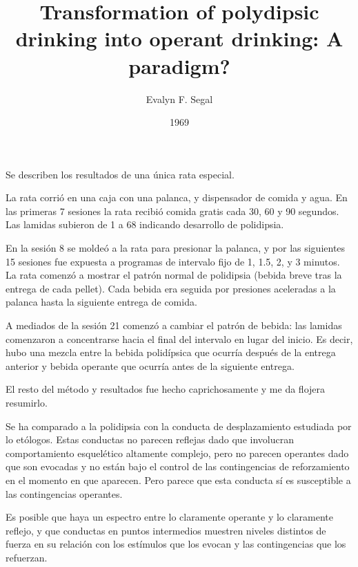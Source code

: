 \documentclass[a4paper,12pt]{article}
\title{Transformation of polydipsic drinking into operant drinking: A paradigm?}
\author{Evalyn F. Segal}
\date{1969}
\begin{document}
{\scshape\bfseries \maketitle}

Se describen los resultados de una única rata especial.

La rata corrió en una caja con una palanca, y dispensador de comida y agua. En las primeras 7 sesiones la rata recibió comida gratis cada 30, 60 y 90 segundos. Las lamidas subieron de 1 a 68 indicando desarrollo de polidipsia.

En la sesión 8 se moldeó a la rata para presionar la palanca, y por las siguientes 15 sesiones fue expuesta a programas de intervalo fijo de 1, 1.5, 2, y 3 minutos. La rata comenzó a mostrar el patrón normal de polidipsia (bebida breve tras la entrega de cada pellet). Cada bebida era seguida por presiones aceleradas a la palanca hasta la siguiente entrega de comida.

A mediados de la sesión 21 comenzó a cambiar el patrón de bebida: las lamidas comenzaron a concentrarse hacia el final del intervalo en lugar del inicio. Es decir, hubo una mezcla entre la bebida polidípsica que ocurría después de la entrega anterior y bebida operante que ocurría antes de la siguiente entrega.

El resto del método y resultados fue hecho caprichosamente y me da flojera resumirlo.

Se ha comparado a la polidipsia con la conducta de desplazamiento estudiada por lo etólogos. Estas conductas no parecen reflejas dado que involucran comportamiento esquelético altamente complejo, pero no parecen operantes dado que son evocadas y no están bajo el control de las contingencias de reforzamiento en el momento en que aparecen. Pero parece que esta conducta sí es susceptible a las contingencias operantes.

Es posible que haya un espectro entre lo claramente operante y lo claramente reflejo, y que conductas en puntos intermedios muestren niveles distintos de fuerza en su relación con los estímulos que los evocan y las contingencias que los refuerzan.
\end{document}
